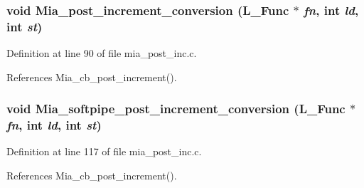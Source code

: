 \subsubsection{\setlength{\rightskip}{0pt plus 5cm}void Mia\_\-post\_\-increment\_\-conversion (L\_\-Func $\ast$ {\em fn}, int {\em ld}, int {\em st})}\label{mia__post__inc_8c_c64f000349a77e579eab4fd04c6e35fd}




Definition at line 90 of file mia\_\-post\_\-inc.c.

References Mia\_\-cb\_\-post\_\-increment().
\subsubsection{\setlength{\rightskip}{0pt plus 5cm}void Mia\_\-softpipe\_\-post\_\-increment\_\-conversion (L\_\-Func $\ast$ {\em fn}, int {\em ld}, int {\em st})}\label{mia__post__inc_8c_b166448104dc3404af2152b2103c8dde}




Definition at line 117 of file mia\_\-post\_\-inc.c.

References Mia\_\-cb\_\-post\_\-increment().
